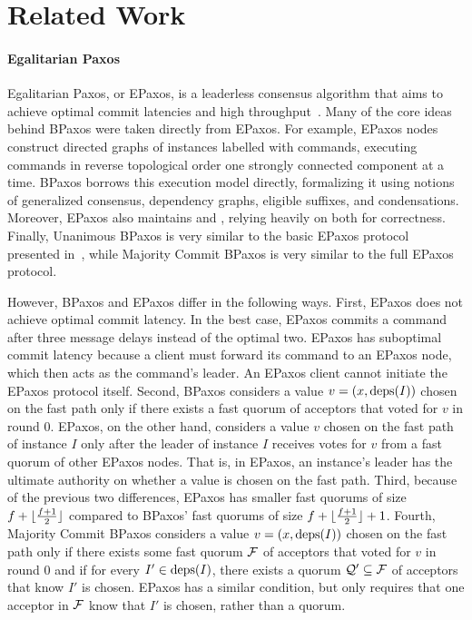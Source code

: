 \section{Related Work}

\paragraph{Egalitarian Paxos}
Egalitarian Paxos, or EPaxos, is a leaderless consensus algorithm that aims to
achieve optimal commit latencies and high throughput~\cite{moraru2013there,
moraru2013proof}. Many of the core ideas behind BPaxos were taken directly from
EPaxos. For example, EPaxos nodes construct directed graphs of instances
labelled with commands, executing commands in reverse topological order one
strongly connected component at a time. BPaxos borrows this execution model
directly, formalizing it using notions of generalized consensus, dependency
graphs, eligible suffixes, and condensations. Moreover, EPaxos also maintains
 and , relying heavily on
both for correctness. Finally, Unanimous BPaxos is very similar to the basic
EPaxos protocol presented in~\cite{moraru2013proof}, while Majority Commit
BPaxos is very similar to the full EPaxos protocol.

However, BPaxos and EPaxos differ in the following ways.
%
First, EPaxos does not achieve optimal commit latency. In the best case, EPaxos
commits a command after three message delays instead of the optimal two. EPaxos
has suboptimal commit latency because a client must forward its command to an
EPaxos node, which then acts as the command's leader. An EPaxos client cannot
initiate the EPaxos protocol itself.
%
Second, BPaxos considers a value $v = (x, \text{deps}(I))$ chosen on the fast path
only if there exists a fast quorum of acceptors that voted for $v$ in round
$0$. EPaxos, on the other hand, considers a value $v$ chosen on the fast path
of instance $I$ only after the leader of instance $I$ receives votes for $v$
from a fast quorum of other EPaxos nodes. That is, in EPaxos, an instance's
leader has the ultimate authority on whether a value is chosen on the fast
path.
%
Third, because of the previous two differences, EPaxos has smaller fast quorums
of size $f + \lfloor\frac{f+1}{2}\rfloor$ compared to BPaxos' fast quorums of size
$f + \lfloor\frac{f + 1}{2}\rfloor + 1$.
%
Fourth, Majority Commit BPaxos considers a value $v = (x, \text{deps}(I))$ chosen on
the fast path only if there exists some fast quorum $\mathcal{F}$ of acceptors
that voted for $v$ in round $0$ and if for every $I' \in \text{deps}(I)$, there
exists a quorum $\mathcal{Q}' \subseteq \mathcal{F}$ of acceptors that know $I'$ is
chosen.  EPaxos has a similar condition, but only requires that one acceptor in
$\mathcal{F}$ know that $I'$ is chosen, rather than a quorum.

